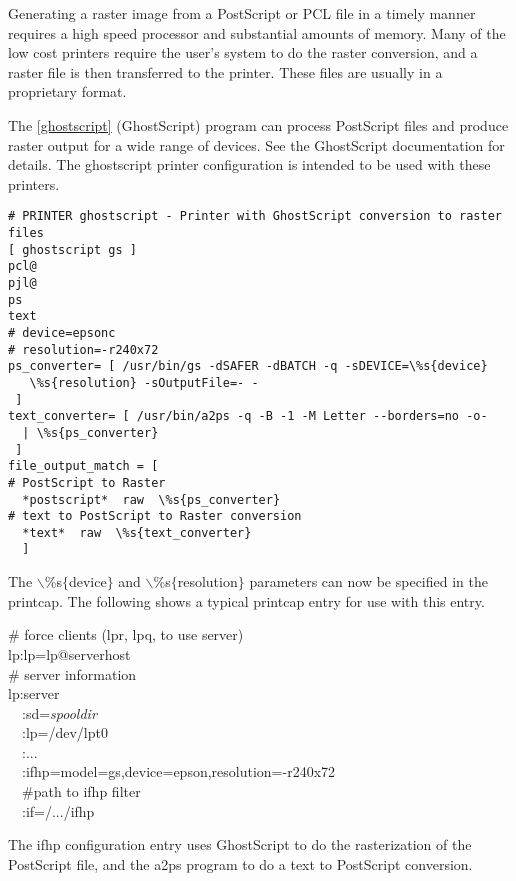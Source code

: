 \documentclass[a4paper]{article}
\begin{document}
Generating a raster image from a PostScript or PCL file in
a timely manner requires a high speed processor and substantial amounts
of memory.
Many of the low cost printers require the user's system to do the raster
conversion,
and a raster file is then transferred to the printer.
These files are usually in a proprietary format.

The \ref{ghostscript} {(GhostScript)}
program can process PostScript files and produce raster output for a
wide range of devices.
See the GhostScript documentation for details.
The {\ttfamily ghostscript} printer configuration is intended to be used
with these printers.
\begin{tscreen}
\begin{verbatim}
# PRINTER ghostscript - Printer with GhostScript conversion to raster files
[ ghostscript gs ]
pcl@
pjl@
ps
text
# device=epsonc
# resolution=-r240x72
ps_converter= [ /usr/bin/gs -dSAFER -dBATCH -q -sDEVICE=\%s{device}
   \%s{resolution} -sOutputFile=- -
 ]
text_converter= [ /usr/bin/a2ps -q -B -1 -M Letter --borders=no -o-
  | \%s{ps_converter}
 ]
file_output_match = [
# PostScript to Raster
  *postscript*  raw  \%s{ps_converter}
# text to PostScript to Raster conversion
  *text*  raw  \%s{text_converter}
  ]   
\end{verbatim}
\end{tscreen}


The {\ttfamily $\backslash$\%s$\{$device$\}$} and {\ttfamily $\backslash$\%s$\{$resolution$\}$} parameters can now be
specified in the printcap.
The following shows a typical printcap entry for use with this entry.
\begin{tscreen}
\#  force clients (lpr, lpq, to use server)\\ 
lp:lp=lp@serverhost \\ 
\# server information  \\ 
lp:server  \\ 
~~:sd={\itshape spooldir\/} \\ 
~~:lp=/dev/lpt0     \\ 
~~:...  \\ 
~~:ifhp=model=gs,device=epson,resolution=-r240x72 \\ 
~~\#path to ifhp filter  \\ 
~~:if=/.../ifhp  \\ 
\end{tscreen}


The {\ttfamily ifhp} configuration entry uses GhostScript to do the
rasterization of the PostScript file,
and the {\ttfamily a2ps} program to do a text to PostScript conversion.
\end{document}

